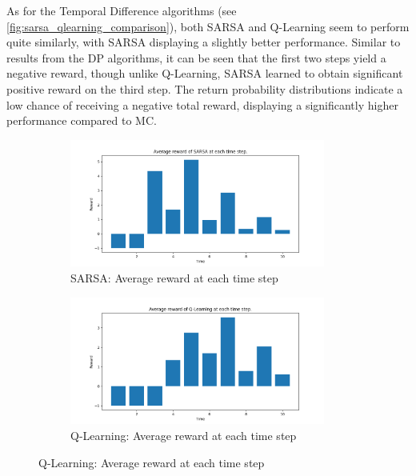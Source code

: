 \documentclass{class}
\begin{document}
\noindent As for the Temporal Difference algorithms (see \autoref{fig:sarsa_qlearning_comparison}), both SARSA and Q-Learning seem to perform quite similarly, with SARSA displaying a slightly better performance. Similar to results from the DP algorithms, it can be seen that the first two steps yield a negative reward, though unlike Q-Learning, SARSA learned to obtain significant positive reward on the third step. The return probability distributions indicate a low chance of receiving a negative total reward, displaying a significantly higher performance compared to MC.

\begin{figure}[H]
    \centering
    \begin{subfigure}[t]{0.47\linewidth}
        \centering
        \includegraphics[height=4.2cm]{../plots/r_over_time/sarsa_r_over_time.png}
        \caption{SARSA: Average reward at each time step}
        \label{fig:sarsa_r_over_time}
    \end{subfigure}
    \hspace{0.03\linewidth}
    \begin{subfigure}[t]{0.47\linewidth}
        \centering
        \includegraphics[height=4.2cm]{../plots/r_over_time/q_learning_r_over_time.png}
        \caption{Q-Learning: Average reward at each time step}
        \label{fig:qlearning_r_over_time}
    \end{subfigure}

    \vspace{0.5cm} %


\end{figure}
\end{document}
